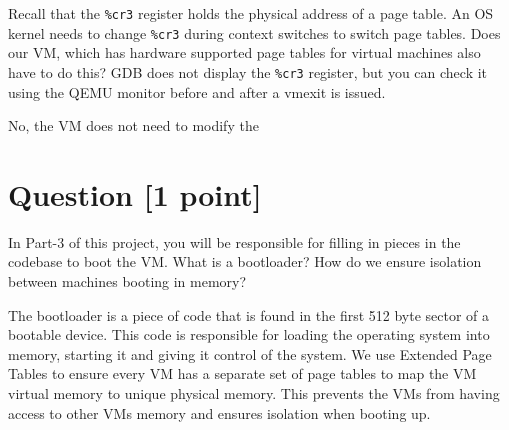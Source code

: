 \documentclass[11pt]{article}
\begin{document}
Recall that the \texttt{\%cr3} register holds the physical address of a page table. An OS kernel needs to change \texttt{\%cr3} during context switches to switch page tables. Does our VM, which has hardware supported page tables for virtual machines also have to do this? GDB does not display the \texttt{\%cr3} register, but you can check it using the QEMU monitor before and after a vmexit is issued.

\begin{solution}
No, the VM does not need to modify the %
\end{solution}


\section{Question [1 point]}

In Part-3 of this project, you will be responsible for filling in pieces in the codebase to boot the VM. What is a bootloader? How do we ensure isolation between machines booting in memory?

\begin{solution}
The bootloader is a piece of code that is found in the first 512 byte sector of a bootable device. This code is responsible for loading the operating system into memory, starting it and giving it control of the system. We use Extended Page Tables to ensure every VM has a separate set of page tables to map the VM virtual memory to unique physical memory. This prevents the VMs from having access to other VMs memory and ensures isolation when booting up.
\end{solution}
\end{document}
